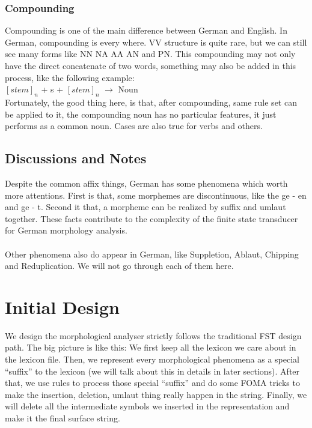 \documentclass[11pt,letterpaper]{article}
\begin{document}
\subsubsection{Compounding}
Compounding is one of the main difference between German and English. In German, compounding is every where. VV structure is quite rare, but we can still see many forms like NN NA AA AN and PN. This compounding may not only have the direct concatenate of two words, something may also be added in this process, like the following example:\\
$[stem]_n$ + s + $[stem]_n$ $\rightarrow$ Noun\\
Fortunately, the good thing here, is that, after compounding, same rule set can be applied to it, the compounding noun has no particular features, it just performs as a common noun. Cases are also true for verbs and others.

\subsection{Discussions and Notes}
Despite the common affix things, German has some phenomena which worth more attentions. First is that, some morphemes are discontinuous, like the ge - en and ge - t. Second it that, a morpheme can be realized by suffix and umlaut together. These facts contribute to the complexity of the finite state transducer for German morphology analysis.\\\\
Other phenomena also do appear in German, like Suppletion, Ablaut, Chipping and Reduplication. We will not go through each of them here.

\section{Initial Design}
We design the morphological analyser strictly follows the traditional FST design path. The big picture is like this: We first keep all the lexicon we care about in the lexicon file. Then, we represent every morphological phenomena as a special ``suffix'' to the lexicon (we will talk about this in details in later sections). After that, we use rules to process those special ``suffix'' and do some FOMA tricks to make the insertion, deletion, umlaut thing really happen in the string. Finally, we will delete all the intermediate symbols we inserted in the representation and make it the final surface string.
\end{document}
